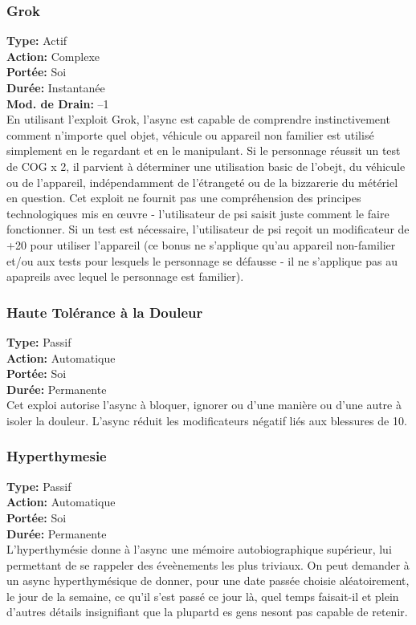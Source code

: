 \subsubsection{Grok} \textbf{Type:} Actif \\ \textbf{Action:} Complexe \\ \textbf{Portée:} Soi \\ \textbf{Durée:} Instantanée \\ \textbf{Mod. de Drain:} –1 \\ En utilisant l'exploit Grok, l'async est capable de comprendre instinctivement comment n'importe quel objet, véhicule ou appareil non familier est utilisé simplement en le regardant et en le manipulant. Si le personnage réussit un test de COG x 2, il parvient à déterminer une utilisation basic de l'obejt, du véhicule ou de l'appareil, indépendamment de l'étrangeté ou de la bizzarerie du métériel en question. Cet exploit ne fournit pas une compréhension des principes technologiques mis en œuvre - l'utilisateur de psi saisit juste comment le faire fonctionner. Si un test est nécessaire, l'utilisateur de psi reçoit un modificateur de +20 pour utiliser l'appareil (ce bonus ne s'applique qu'au appareil non-familier et/ou aux tests pour lesquels le personnage se défausse - il ne s'applique pas au apapreils avec lequel le personnage est familier). 

\subsubsection{Haute Tolérance à la Douleur} \textbf{Type:} Passif \\ \textbf{Action:} Automatique \\ \textbf{Portée:} Soi \\ \textbf{Durée:} Permanente \\ Cet exploi autorise l'async à bloquer, ignorer ou d'une manière ou d'une autre à isoler la douleur. L'async réduit les modificateurs négatif liés aux blessures de 10. 

\subsubsection{Hyperthymesie} \textbf{Type:} Passif \\ \textbf{Action:} Automatique \\ \textbf{Portée:} Soi \\ \textbf{Durée:} Permanente \\ L'hyperthymésie donne à l'async une mémoire autobiographique supérieur, lui permettant de se rappeler des éveènements les plus triviaux. On peut demander à un async hyperthymésique de donner, pour une date passée choisie aléatoirement, le jour de la semaine, ce qu'il s'est passé ce jour là, quel temps faisait-il et plein d'autres détails insignifiant que la plupartd es gens nesont pas capable de retenir. 

